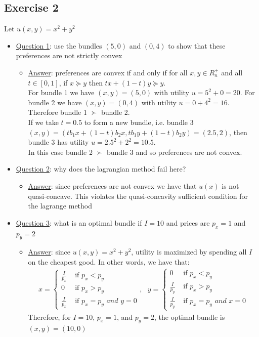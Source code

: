 \documentclass{article}
\begin{document}
\subsection{Exercise 2}
Let $u(x,y) = x^{2} + y^{2}$ \par \vspace{0.3em}
\begin{itemize}
  \item  \underline{Question 1}: use the bundles $(5,0)$ and $(0,4)$ to show that these preferences are not strictly convex
  \begin{itemize}
    \item  \underline{Answer}: preferences are convex if and only if for all $x,y \in R_{n}^{+}$ and all $t \in [0,1]$, if $x \succeq y$ then $tx + (1-t)y \succeq y$.\\ For bundle 1 we have $(x,y) = (5,0)$ with utility $u  = 5^{2} + 0 = 20$. For bundle 2 we have $(x,y) = (0,4)$ with utility $u = 0 + 4^{2} = 16$. Therefore bundle 1 $\succ$ bundle 2.\\ If we take $t=0.5$ to form a new bundle, i.e. bundle 3 $(x,y) = (tb_{1} x + (1-t)b_{2}x, tb_{1}y + (1-t)b_{2}y) = (2.5, 2)$, then bundle 3 has utility $u = 2.5^{2} + 2^{2} = 10.5$.\\ In this case bundle 2 $\succ$ bundle 3 and so preferences are not convex.
  \end{itemize}
  \item  \underline{Question 2}: why does the lagrangian method fail here?
  \begin{itemize}
    \item  \underline{Answer}: since preferences are not convex we have that $u(x)$ is not quasi-concave. This violates the quasi-concavity sufficient condition for the lagrange method
  \end{itemize}
  \item  \underline{Question 3}: what is an optimal bundle if $I=10$ and prices are $p_{x}=1$ and $p_{y} = 2$
  \begin{itemize}
    \item  \underline{Answer}: since $u(x, y) = x^{2} + y^{2}$, utility is maximized by spending all $I$ on the cheapest good. In other words, we have that:
    \begin{gather*}
      x =
      \begin{cases}
        \frac{I}{p_{x}} & \text{ if } p_{x}<p_{y} \\
        0 & \text{ if } p_{x} > p_{y} \\
        \frac{I}{p_{x}} &  \text{ if } p_{x} = p_{y} \textit{ and } y = 0
       \end{cases}
      , \ \ \
      y =
      \begin{cases}
        0 & \text{ if } p_{x}<p_{y} \\
        \frac{I}{p_{y}} & \text{ if } p_{x} > p_{y} \\
        \frac{I}{p_{y}} &  \text{ if } p_{x} = p_{y} \textit{ and } x = 0
       \end{cases}
    \end{gather*}
    Therefore, for $I=10$, $p_{x} = 1$, and $p_{y} = 2$, the optimal bundle is $(x, y) = (10, 0)$
  \end{itemize}
\end{itemize}
\end{document}
